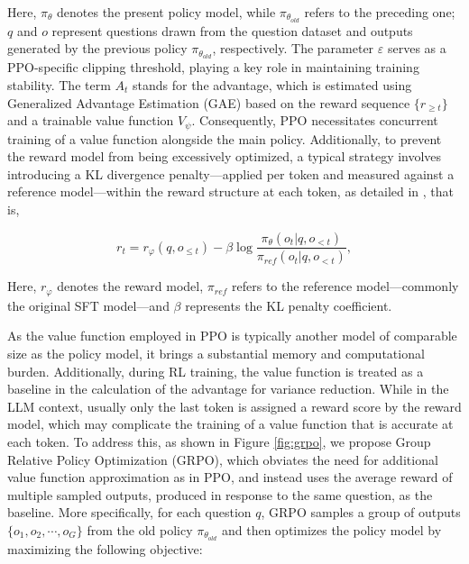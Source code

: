 \begin{itemize}[topsep=0pt]
Here, $\pi_{\theta}$ denotes the present policy model, while $\pi_{\theta_{old}}$ refers to the preceding one; $q$ and $o$ represent questions drawn from the question dataset and outputs generated by the previous policy $\pi_{\theta_{old}}$, respectively. The parameter $\varepsilon$ serves as a PPO-specific clipping threshold, playing a key role in maintaining training stability. The term $A_t$ stands for the advantage, which is estimated using Generalized Advantage Estimation (GAE) \citep{gae} based on the reward sequence $\{r_{\ge t}\}$ and a trainable value function $V_{\psi}$. Consequently, PPO necessitates concurrent training of a value function alongside the main policy. Additionally, to prevent the reward model from being excessively optimized, a typical strategy involves introducing a KL divergence penalty—applied per token and measured against a reference model—within the reward structure at each token, as detailed in \citep{ouyang2022training}, that is,

\begin{equation}
    r_{t} = r_\varphi(q, o_{\le t}) - \beta \log\frac{\pi_{\theta}(o_{t}|q, o_{<t})}{\pi_{ref}(o_{t}|q, o_{<t})},
\label{eq:PPO-reward}
\end{equation}

Here, $r_\varphi$ denotes the reward model, $\pi_{ref}$ refers to the reference model—commonly the original SFT model—and $\beta$ represents the KL penalty coefficient.

As the value function employed in PPO is typically another model of comparable size as the policy model, it brings a substantial memory and computational burden. Additionally, during RL training, the value function is treated as a baseline in the calculation of the advantage for variance reduction. While in the LLM context, usually only the last token is assigned a reward score by the reward model, which may complicate the training of a value function that is accurate at each token. To address this, as shown in Figure \ref{fig:grpo}, we propose Group Relative Policy Optimization (GRPO), which obviates the need for additional value function approximation as in PPO, and instead uses the average reward of multiple sampled outputs, produced in response to the same question, as the baseline. More specifically, for each question $q$, GRPO samples a group of outputs $\{o_1, o_2, \cdots, o_G\}$  from the old policy  $\pi_{\theta_{old}}$  and then optimizes the policy model by maximizing the following objective:


\end{itemize}

